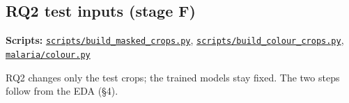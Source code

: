 \documentclass[11pt,a4paper]{article}
\begin{document}
\subsection{RQ2 test inputs (stage F)}

\textbf{Scripts:} \href{https://gitlab.uvt.nl/capstone/2026-fall/u927271/-/blob/v1.0-final/scripts/build_masked_crops.py}{\texttt{scripts/\allowbreak{}build\_\allowbreak{}masked\_\allowbreak{}crops.\allowbreak{}py}}, \href{https://gitlab.uvt.nl/capstone/2026-fall/u927271/-/blob/v1.0-final/scripts/build_colour_crops.py}{\texttt{scripts/\allowbreak{}build\_\allowbreak{}colour\_\allowbreak{}crops.\allowbreak{}py}}, \href{https://gitlab.uvt.nl/capstone/2026-fall/u927271/-/blob/v1.0-final/malaria/colour.py}{\texttt{malaria/\allowbreak{}colour.\allowbreak{}py}}

RQ2 changes only the test crops; the trained models stay fixed. The two steps follow from the EDA (\S{}4).
\end{document}
